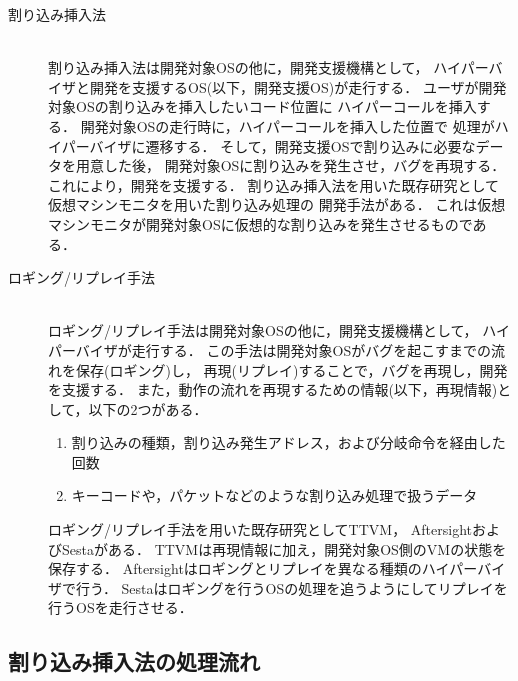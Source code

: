 \documentclass[submit,techreq,noauthor,dvipdfmx]{ipsj}
\begin{document}
\begin{description}
    \item[割り込み挿入法]\mbox{}\\
        割り込み挿入法は開発対象OSの他に，開発支援機構として，
        ハイパーバイザと開発を支援するOS(以下，開発支援OS)が走行する．
        ユーザが開発対象OSの割り込みを挿入したいコード位置に
        ハイパーコールを挿入する．
        開発対象OSの走行時に，ハイパーコールを挿入した位置で
        処理がハイパーバイザに遷移する．
        そして，開発支援OSで割り込みに必要なデータを用意した後，
        開発対象OSに割り込みを発生させ，バグを再現する．
        これにより，開発を支援する．
        割り込み挿入法を用いた既存研究として仮想マシンモニタを用いた割り込み処理の
        開発手法\cite{miyahara}がある．
        これは仮想マシンモニタが開発対象OSに仮想的な割り込みを発生させるものである．
    \item[ロギング/リプレイ手法]\mbox{}\\
        ロギング/リプレイ手法は開発対象OSの他に，開発支援機構として，
        ハイパーバイザが走行する．
        この手法は開発対象OSがバグを起こすまでの流れを保存(ロギング)し，
        再現(リプレイ)することで，バグを再現し，開発を支援する．
        また，動作の流れを再現するための情報(以下，再現情報)として，以下の2つがある．
        \begin{enumerate}
            \item 割り込みの種類，割り込み発生アドレス，および分岐命令を経由した回数
            \item キーコードや，パケットなどのような割り込み処理で扱うデータ
        \end{enumerate}
        ロギング/リプレイ手法を用いた既存研究としてTTVM\cite{samuel}，
        Aftersight\cite{jim}およびSesta\cite{kawasaki}がある．
        TTVMは再現情報に加え，開発対象OS側のVMの状態を保存する．
        Aftersightはロギングとリプレイを異なる種類のハイパーバイザで行う．
        Sestaはロギングを行うOSの処理を追うようにしてリプレイを行うOSを走行させる．
\end{description}


\subsection{割り込み挿入法の処理流れ}\label{sec:processing_flow_interrupt_inserting_method}

\end{document}
